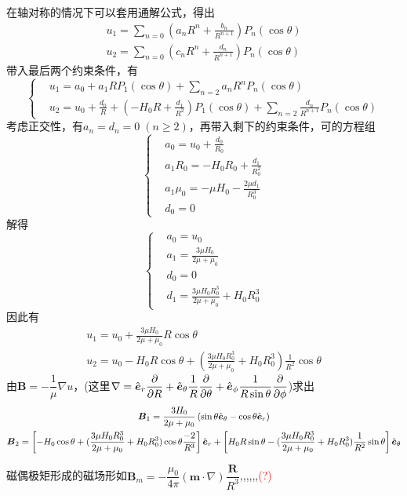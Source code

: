 \documentclass{mynote}
\begin{document}
\begin{solution}
在轴对称的情况下可以套用通解公式，得出
\begin{gather*}
    u_1 = \sum_{n=0} \left( a_n R^n + \frac{b_n}{R^{n+1}} \right) P_n (\cos \theta) \\
    u_2 = \sum_{n=0} \left( c_n R^n + \frac{d_n}{R^{n+1}} \right) P_n (\cos \theta)
\end{gather*}
带入最后两个约束条件，有
\[
\left\{
    \begin{aligned}
        & u_1 = a_0 + a_1 R P_1(\cos \theta) + \sum_{n=2} a_n R^n P_n (\cos \theta) \\
        & u_2 = u_0 + \frac{d_0}{R} + (-H_0 R + \frac{d_1}{R^2}) P_1(\cos \theta) + \sum_{n=2} \frac{d_n}{R^{n+1}}P_n(\cos \theta)
    \end{aligned}
\right.    
\]
考虑正交性，有$a_n = d_n = 0\;(n \geq 2)$，再带入剩下的约束条件，可的方程组
\[
\left\{
    \begin{aligned}
        & a_0 = u_0 + \frac{d_0}{R_0} \\
        & a_1 R_0 = -H_0 R_0 + \frac{d_1}{R_0^2} \\
        & a_1 \mu_0 = -\mu H_0 - \frac{2\mu d_1}{R_0^3} \\
        & d_0 = 0
    \end{aligned} 
\right.    
\]
解得
\[
\left\{
    \begin{aligned}
        & a_0 = u_0 \\
        & a_1 = \frac{3\mu H_0}{2\mu + \mu_0} \\
        & d_0 = 0 \\
        & d_1 = \frac{3\mu H_0 R_0^3}{2\mu + \mu_0} + H_0 R_0^3
    \end{aligned} 
\right.    
\]
因此有
\begin{gather*}
    u_1 = u_0 + \frac{3\mu H_0}{2\mu + \mu_0} R \cos \theta \\
    u_2 = u_0 -H_0 R \cos \theta + (\frac{3\mu H_0 R_0^3}{2\mu + \mu_0} + H_0 R_0^3) \frac{1}{R^2} \cos \theta
\end{gather*}
由$\bm{B} = -\dfrac{1}{\mu} \nabla u$，(这里$\nabla = \hat{\boldsymbol{e}}_r \dfrac{\partial }{\partial R} + \hat{\boldsymbol{e}}_{\theta} \dfrac{1}{R} \dfrac{\partial }{\partial \theta} + \hat{\boldsymbol{e}}_{\phi} \dfrac{1}{R\sin \theta} \dfrac{\partial }{\partial \phi}$)求出
\begin{gather*}
    \boldsymbol{B}_1 = \frac{3 H_0}{2\mu + \mu_0} \left( \sin \theta \hat{\boldsymbol{e}}_{\theta} - \cos \theta \hat{\boldsymbol{e}}_{r} \right) \\
    \boldsymbol{B}_2 = \left[ -H_0 \cos \theta + (\frac{3\mu H_0 R_0^3}{2\mu + \mu_0} + H_0 R_0^3) \cos \theta \frac{-2}{R^3} \right] \hat{\boldsymbol{e}}_r + \left[ H_0 R \sin \theta - (\frac{3\mu H_0 R_0^3}{2\mu + \mu_0} + H_0 R_0^3)\frac{1}{R^2} \sin \theta \right] \hat{\boldsymbol{e}}_{\theta}
\end{gather*}


磁偶极矩形成的磁场形如$\bm{B}_m  = -\dfrac{\mu_0}{4\pi} (\bm{m} \cdot \nabla) \dfrac{\bm{R}}{R^3}$,,,,,,\textcolor{red}{(?)}

\end{solution}
\end{document}
